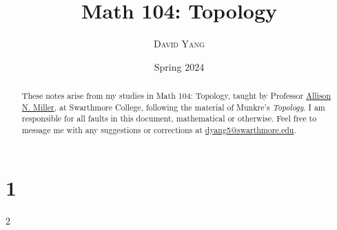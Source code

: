 \documentclass[11pt]{article}
\begin{document}
\title{\LARGE \textbf{Math 104: Topology}}
\date{Spring 2024}
\author{\textsc{David Yang}}

\maketitle

\begin{abstract}
These notes arise from my studies in Math 104: Topology, taught by 
Professor \href{https://sites.google.com/view/anmiller/}{Allison N. Miller}, at Swarthmore College, following the material of Munkre's \textit{Topology}.
I am responsible for all faults in this document, mathematical or otherwise.
Feel free to message me with any suggestions or corrections at \href{mailto:dyang5@swarthmore.edu}{dyang5@swarthmore.edu}.
\end{abstract}

\tableofcontents

\chapter{1}{2}
\end{document}
